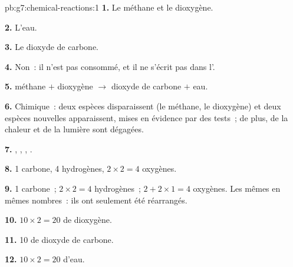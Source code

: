 \begin{solution}{pb:g7:chemical-reactions:1}
\textbf{1.} Le méthane et le dioxygène.

\textbf{2.} L'eau.

\textbf{3.} Le dioxyde de carbone.

\textbf{4.} Non~: il n'est pas consommé, et il ne s'écrit pas dans
l'.

\textbf{5.} méthane $+$ dioxygène $\longrightarrow$ dioxyde de carbone
$+$ eau.

\textbf{6.} Chimique~: deux espèces disparaissent (le méthane, le
dioxygène) et deux espèces nouvelles apparaissent, mises en évidence par
des tests~; de plus, de la chaleur et de la lumière sont dégagées.

\textbf{7.} , , , .

\textbf{8.} 1 carbone, 4 hydrogènes, $2 \times 2 = 4$ oxygènes.

\textbf{9.} 1 carbone~; $2 \times 2 = 4$ hydrogènes~; $2 + 2 \times 1 = 4$
oxygènes. Les mêmes  en mêmes nombres~: ils ont seulement été
réarrangés.

\textbf{10.} $10 \times 2 = 20$  de dioxygène.

\textbf{11.} 10  de dioxyde de carbone.

\textbf{12.} $10 \times 2 = 20$  d'eau.
\end{solution}
